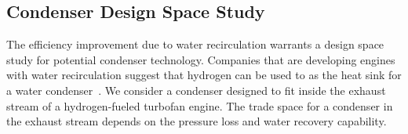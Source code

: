 \documentclass[conf]{new-aiaa}
\begin{document}
\subsection{Condenser Design Space Study}
\label{sub:dpqp_sweep}
The efficiency improvement due to water recirculation warrants a design space study for potential condenser technology.
Companies that are developing engines with water recirculation suggest that hydrogen can be used to as the heat sink for a water condenser~\cite{arpa-e_2021}.
We consider a condenser designed to fit inside the exhaust stream of a hydrogen-fueled turbofan engine.
The trade space for a condenser in the exhaust stream depends on the pressure loss and water recovery capability.
\end{document}
